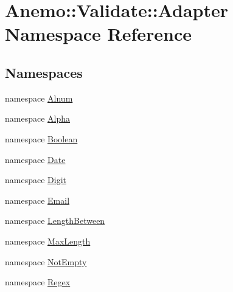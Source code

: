 \hypertarget{namespace_anemo_1_1_validate_1_1_adapter}{
\section{Anemo::Validate::Adapter Namespace Reference}
\label{namespace_anemo_1_1_validate_1_1_adapter}
}
\subsection*{Namespaces}
\begin{DoxyCompactItemize}
\item 
namespace \hyperlink{namespace_anemo_1_1_validate_1_1_adapter_1_1_alnum}{Alnum}
\item 
namespace \hyperlink{namespace_anemo_1_1_validate_1_1_adapter_1_1_alpha}{Alpha}
\item 
namespace \hyperlink{namespace_anemo_1_1_validate_1_1_adapter_1_1_boolean}{Boolean}
\item 
namespace \hyperlink{namespace_anemo_1_1_validate_1_1_adapter_1_1_date}{Date}
\item 
namespace \hyperlink{namespace_anemo_1_1_validate_1_1_adapter_1_1_digit}{Digit}
\item 
namespace \hyperlink{namespace_anemo_1_1_validate_1_1_adapter_1_1_email}{Email}
\item 
namespace \hyperlink{namespace_anemo_1_1_validate_1_1_adapter_1_1_length_between}{LengthBetween}
\item 
namespace \hyperlink{namespace_anemo_1_1_validate_1_1_adapter_1_1_max_length}{MaxLength}
\item 
namespace \hyperlink{namespace_anemo_1_1_validate_1_1_adapter_1_1_not_empty}{NotEmpty}
\item 
namespace \hyperlink{namespace_anemo_1_1_validate_1_1_adapter_1_1_regex}{Regex}
\end{DoxyCompactItemize}
